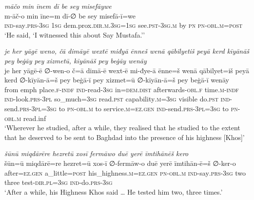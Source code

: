 \ea \label{ŽP.74}
\textit{māčo min īnem dī be sey misefāywe} \\ 
\gll m-āč-o min īne=m dī-∅ be sey misefā-ī=we \\ 
 \textsc{ind-}say\textsc{.prs}\textsc{-3sg} \textsc{1sg} dem.prox\textsc{.dir}\textsc{.m}\textsc{.3sg}\textsc{=\textsc{1sg}} see\textsc{.pst}\textsc{-3sg}\textsc{.m} by \textsc{pn} \textsc{pn}\textsc{-obl}\textsc{.m}\textsc{=\textsc{post}} \\ 
\glt `He said, ‘I witnessed this about Say Mustafa.’'
\z 
 
\ea \label{ŽP.80}
\textit{je her yāgē weno, čā dimāyē wextē miđyā ēnneš wenā qābilyetiš peyā kerd kīyānāš pey beġāy pey xizmetū, kīyānāš pey beġāy wenāy} \\ 
\gll je her yāgē-ē ∅-wen-o č=ā dimā-ē wext-ē mi-đye-ā ēnne=š wenā qābilyet=iš peyā kerd ∅-kīyān-ā=š pey beġā-ī pey xizmet=ū ∅-kīyān-ā=š pey beġā-ī wenāy \\ 
 from emph place\textsc{.f}\textsc{-indf} \textsc{ind-}read\textsc{-3sg} in=\textsc{dem.dist} afterwards\textsc{-obl}\textsc{.f} time\textsc{.m}\textsc{-indf} \textsc{ind-}look\textsc{.prs}\textsc{-3pl} so\_much\textsc{=3sg} read\textsc{.pst} capability\textsc{.m}\textsc{=3sg} visible do\textsc{.pst} \textsc{ind-}send\textsc{.prs}\textsc{-3pl}\textsc{=3sg} to \textsc{pn}\textsc{-obl}\textsc{.m} to service\textsc{.m}\textsc{\textsc{=ez.gen}} \textsc{ind-}send\textsc{.prs}\textsc{-3pl}\textsc{=3sg} to \textsc{pn}\textsc{-obl}\textsc{.m} read.inf \\ 
\glt `Wherever he studied, after a while, they realised that he studied to the extent that he deserved to be sent to Baghdad into the presence of his highness [Khos]'
\z 
 
\ea \label{ŽP.82}
\textit{šūnū miqdārēre hezretū xosī fermāwo duē yerē īmtihānēš kero} \\ 
\gll šūn=ū miqdārē=re hezret=ū xos-ī ∅-fermāw-o duē yerē īmtihān-ē=š ∅-ker-o \\ 
 after\textsc{\textsc{=ez.gen}} a\_little\textsc{=\textsc{post}} his\_highness\textsc{.m}\textsc{\textsc{=ez.gen}} \textsc{pn}\textsc{-obl}\textsc{.m} \textsc{ind-}say\textsc{.prs}\textsc{-3sg} two three test\textsc{-dir}\textsc{.pl}\textsc{=3sg} \textsc{ind-}do\textsc{.prs}\textsc{-3sg} \\ 
\glt `After a while, his Highness Khos said … He tested him two, three times.'
\z 
 
